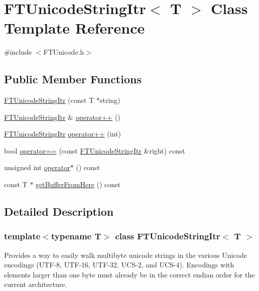 \hypertarget{class_f_t_unicode_string_itr}{
\section{FTUnicodeStringItr$<$ T $>$ Class Template Reference}
\label{class_f_t_unicode_string_itr}
}


{\ttfamily \#include $<$FTUnicode.h$>$}

\subsection*{Public Member Functions}
\begin{DoxyCompactItemize}
\item 
\hyperlink{class_f_t_unicode_string_itr_ab640405eaa904f1609f1b659e5657989}{FTUnicodeStringItr} (const T $\ast$string)
\item 
\hyperlink{class_f_t_unicode_string_itr}{FTUnicodeStringItr} \& \hyperlink{class_f_t_unicode_string_itr_a476aa8e48d5ea56de9ee979af1cd4007}{operator++} ()
\item 
\hyperlink{class_f_t_unicode_string_itr}{FTUnicodeStringItr} \hyperlink{class_f_t_unicode_string_itr_a84c9354998144c4f221cde699e3f8455}{operator++} (int)
\item 
bool \hyperlink{class_f_t_unicode_string_itr_ae27e7162e014fbcbf731a50bd34b2946}{operator==} (const \hyperlink{class_f_t_unicode_string_itr}{FTUnicodeStringItr} \&right) const 
\item 
unsigned int \hyperlink{class_f_t_unicode_string_itr_a90300d6888d77e7a349b0d476a7c0bb4}{operator$\ast$} () const 
\item 
const T $\ast$ \hyperlink{class_f_t_unicode_string_itr_a8ced99f40fd1af46e0a76b844187efe1}{getBufferFromHere} () const 
\end{DoxyCompactItemize}


\subsection{Detailed Description}
\subsubsection*{template$<$typename T$>$ class FTUnicodeStringItr$<$ T $>$}

Provides a way to easily walk multibyte unicode strings in the various Unicode encodings (UTF-\/8, UTF-\/16, UTF-\/32, UCS-\/2, and UCS-\/4). Encodings with elements larger than one byte must already be in the correct endian order for the current architecture. 

